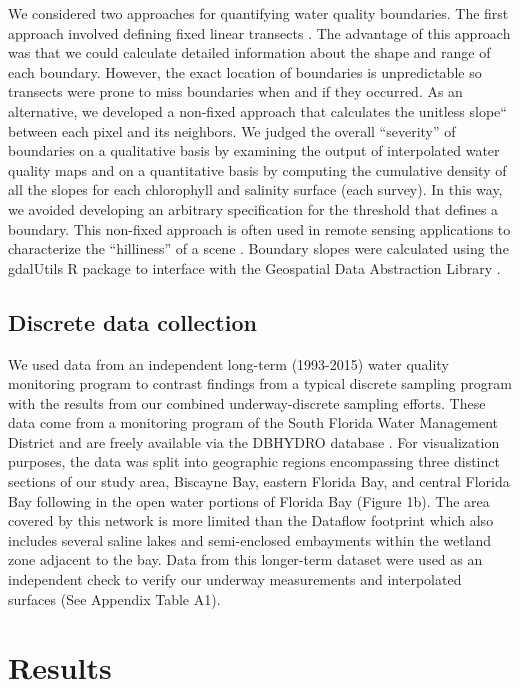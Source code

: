 \documentclass[review]{elsarticle}
\begin{document}
We considered two approaches for quantifying water quality boundaries. The first approach involved defining fixed linear transects \citep{dale2014spatial}. The advantage of this approach was that we could calculate detailed information about the shape and range of each boundary. However, the exact location of boundaries is unpredictable so transects were prone to miss boundaries when and if they occurred. As an alternative, we developed a non-fixed approach that calculates the unitless slope“ between each pixel and its neighbors. We judged the overall “severity” of boundaries on a qualitative basis by examining the output of interpolated water quality maps and on a quantitative basis by computing the cumulative density of all the slopes for each chlorophyll and salinity surface (each survey). In this way, we avoided developing an arbitrary specification for the threshold that defines a boundary. This non-fixed approach is often used in remote sensing applications to characterize the “hilliness” of a scene \citep{jordan2003morphometric}. Boundary slopes were calculated using the gdalUtils R package to interface with the Geospatial Data Abstraction Library \citep{gdalutils, GDAL2017}.

\subsection{Discrete data collection}

We used data from an independent long-term (1993-2015) water quality monitoring program to contrast findings from a typical discrete sampling program with the results from our combined underway-discrete sampling efforts. These data come from a monitoring program of the South Florida Water Management District and are freely available via the DBHYDRO database \citep{dbhydror}. For visualization purposes, the data was split into geographic regions encompassing three distinct sections of our study area, Biscayne Bay, eastern Florida Bay, and central Florida Bay following \citet{boyer_seasonal_1999} in the open water portions of Florida Bay (Figure 1b). The area covered by this network is more limited than the Dataflow footprint which also includes several saline lakes and semi-enclosed embayments within the wetland zone adjacent to the bay. Data from this longer-term dataset were used as an independent check to verify our underway measurements and interpolated surfaces (See Appendix Table A1).

\section{Results}
\end{document}
